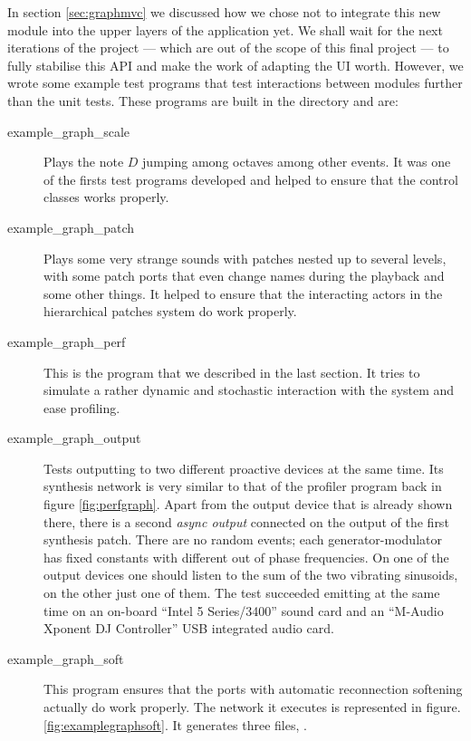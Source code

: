 In section \ref{sec:graphmvc} we discussed how we chose not to
integrate this new module into the upper layers of the application
yet. We shall wait for the next iterations of the project --- which
are out of the scope of this final project --- to fully stabilise this
API and make the work of adapting the UI worth. However, we wrote some
example test programs that test interactions between modules further
than the unit tests. These programs are built in the 
directory and are:
\begin{description}
\item[example\_graph\_scale] Plays the note $D$ jumping among octaves
  among other events. It was one of the firsts test programs developed
  and helped to ensure that the control classes works properly.

\item[example\_graph\_patch] Plays some very strange sounds with
  patches nested up to several levels, with some patch ports that even
  change names during the playback and some other things. It helped to
  ensure that the interacting actors in the hierarchical patches
  system do work properly.

\item[example\_graph\_perf] This is the program that we described in
  the last section. It tries to simulate a rather dynamic and
  stochastic interaction with the system and ease profiling.

\item[example\_graph\_output] Tests outputting to two different
  proactive devices at the same time. Its synthesis network is very
  similar to that of the profiler program back in figure
  \ref{fig:perfgraph}. Apart from the output device that is already
  shown there, there is a second \emph{async output} connected on the
  output of the first synthesis patch. There are no random events;
  each generator-modulator has fixed constants with different out of
  phase frequencies. On one of the output devices one should listen to
  the sum of the two vibrating sinusoids, on the other just one of
  them. The test succeeded emitting at the same time on an on-board
  ``Intel 5 Series/3400'' sound card and an ``M-Audio Xponent DJ
  Controller'' USB integrated audio card.

\item[example\_graph\_soft] This program ensures that the ports with
  automatic reconnection softening actually do work properly. The
  network it executes is represented in figure. 
  \ref{fig:examplegraphsoft}. It generates three files,
  . 


\end{description}
